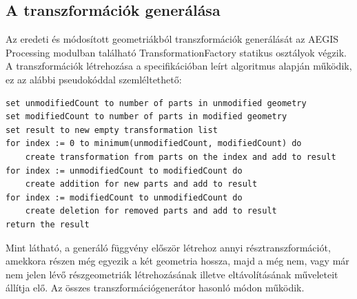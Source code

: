 \subsection{A transzformációk generálása}
Az eredeti és módosított geometriákból transzformációk generálását az AEGIS Processing modulban található TransformationFactory statikus osztályok végzik.
A transzformációk létrehozása a specifikációban leírt algoritmus alapján működik, ez az alábbi pseudokóddal szemléltethető:
\begingroup
{}
\begin{lstlisting}
set unmodifiedCount to number of parts in unmodified geometry
set modifiedCount to number of parts in modified geometry
set result to new empty transformation list
for index := 0 to minimum(unmodifiedCount, modifiedCount) do
	create transformation from parts on the index and add to result
for index := unmodifiedCount to modifiedCount do
	create addition for new parts and add to result
for index := modifiedCount to unmodifiedCount do
	create deletion for removed parts and add to result
return the result
\end{lstlisting}
\endgroup
{}
Mint látható, a generáló függvény először létrehoz annyi résztranszformációt, amekkora részen még egyezik a két geometria hossza, majd a még nem, vagy már nem jelen lévő részgeometriák létrehozásának illetve eltávolításának műveleteit állítja elő. Az összes transzformációgenerátor hasonló módon működik.

